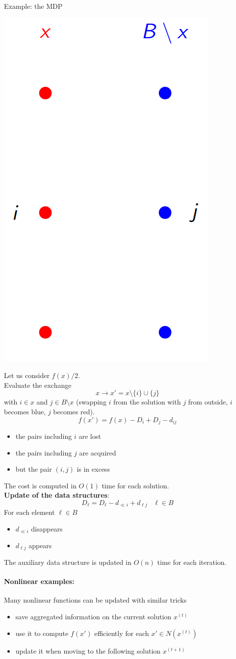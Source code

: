 \documentclass[11pt]{article}
\begin{document}
	\newpage
	
	
	Example: the MDP
	\begin{center}
		\includegraphics[width=0.25\columnwidth]{img/MDP2}
	\end{center}
	Let us consider $f (x) /2$.\\
	
	Evaluate the exchange
	$$ x \rightarrow x' = x \setminus \{i\} \cup \{j\} $$
	with $i \in x$ and $j \in B \setminus x$ (swapping $i$ from the solution with $j$ from outside, $i$ becomes blue, $j$ becomes red).\\
	
	$$ f (x') = f (x) − D_i + D_j − d_{ij} $$
	
	\begin{itemize}
		\item the pairs including $i$ are lost
		\item the pairs including $j$ are acquired
		\item but the pair $(i, j)$ is in excess
	\end{itemize}
	The cost is computed in $O (1)$ time for each solution.\\
	
	\textbf{Update of the data structures}:
	$$ D_{\ell} = D_{\ell} - d_{\ll i} + d_{\ell j} \;\;\; \ell \in B $$
	For each element $\ell \in B$
	\begin{itemize}
		\item $d_{\ll i}$ disappears
		\item $d_{\ell j}$ appears
	\end{itemize}
	
	The auxiliary data structure is updated in $O (n)$ time for each iteration.\\
	
	\newpage
	
	\paragraph{Nonlinear examples:} Many nonlinear functions can be updated with similar tricks
	\begin{itemize}
		\item save aggregated information on the current solution $x^{(t)}$
		
		\item use it to compute $f (x')$ efficiently for each $x' \in N (x^{(t)})$
		
		\item update it when moving to the following solution $x^{(t+1)}$
	\end{itemize}
	
\end{document}
